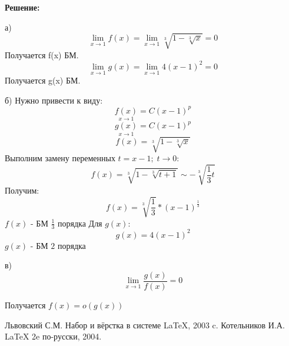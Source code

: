 \documentclass[12pt]{article}
\begin{document}
\textbf{Решение:}

а)
$$\lim\limits_{x\rightarrow 1} f(x) = \lim\limits_{x\rightarrow 1}\sqrt[3]{1-{\sqrt[3]{x}}}=0 $$ 
Получается f(x) БМ.
$$\lim\limits_{x\rightarrow 1} g(x) = \lim\limits_{x\rightarrow 1} 4(x-1)^{2} = 0 $$
Получается g(x) БМ.

б)
Нужно привести к виду:
$$\underset{x \rightarrow 1}{f(x)} = C(x-1)^{p}$$
$$\underset{x \rightarrow 1}{g(x)} = C(x-1)^{p}$$
$$f(x) = \sqrt[3]{1-{\sqrt[3]{x}}}$$
Выполним замену переменных $t = x-1; \; t \rightarrow 0:$
$$f(x)=\sqrt[3]{1-{\sqrt[3]{t+1}}} \sim -\sqrt[3]{\frac{1}{3} t}$$
Получим:
$$f(x)= \sqrt[3]{\frac{1}{3}} * (x-1)^{\frac{1}{3}}$$
$f(x)$ - БМ $\frac{1}{3}$ порядка
Для $g(x)$:
$$g(x) = 4(x-1)^{2}$$
$g(x)$ - БМ $2$ порядка

в)
$$\lim\limits_{x\rightarrow 1} \frac{g(x)}{f(x)} = 0$$ 

Получается $f(x) = o(g(x))$

\newpage
{}
\begin{thebibliography}{99}
 Львовский С.М. Набор и вёрстка в системе \LaTeX, 2003 c.
 Котельников И.А. \LaTeX \; 2e по-русски, 2004.
\end{thebibliography}
\end{document}
